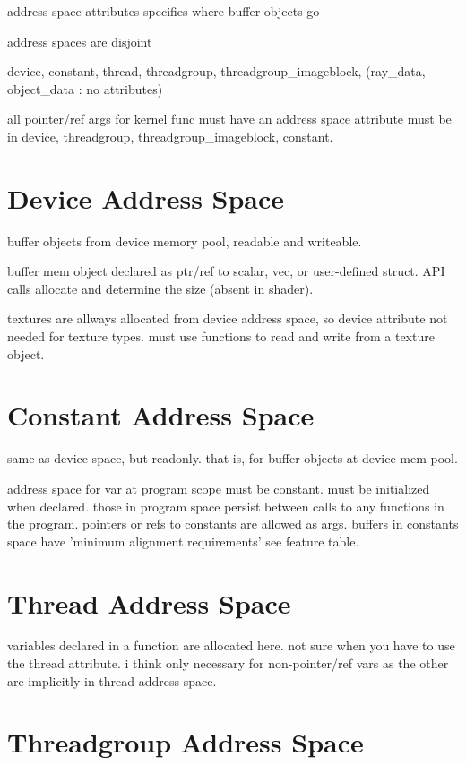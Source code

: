 

address space attributes specifies where buffer objects go

address spaces are disjoint

device, constant, thread, threadgroup, threadgroup_imageblock, (ray_data, object_data : no attributes)

all pointer/ref args for kernel func must have an address space attribute
must be in device, threadgroup, threadgroup_imageblock, constant.

\section{Device Address Space}

buffer objects from device memory pool, readable and writeable.

buffer mem object declared as ptr/ref to scalar, vec, or user-defined struct. API calls allocate and determine the size (absent in shader).

textures are allways allocated from device address space, so device attribute not needed for texture types.
must use functions to read and write from a texture object.

\section{Constant Address Space}

same as device space, but readonly.
that is, for buffer objects at device mem pool. 

address space for var at program scope must be constant. must be initialized when declared.
those in program space persist between calls to any functions in the program.
pointers or refs to constants are allowed as args. 
buffers in constants space have 'minimum alignment requirements' see feature table.

\section{Thread Address Space}

variables declared in a function are allocated here.
not sure when you have to use the thread attribute.
i think only necessary for non-pointer/ref vars as the other are implicitly in thread address space. 

\section{Threadgroup Address Space}

